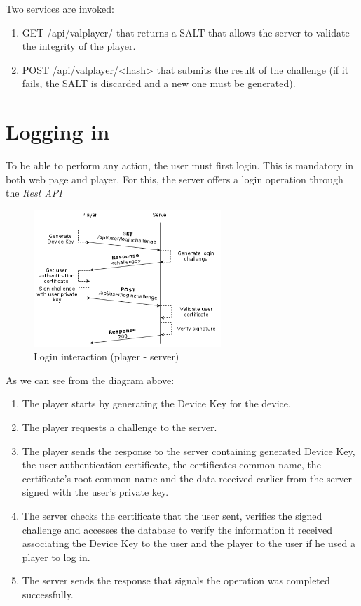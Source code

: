 \documentclass[11pt,a4paper]{report}
\begin{document}
Two services are invoked:  
\begin{enumerate}
\item GET   /api/valplayer/ that returns a SALT that allows the server to validate the integrity of the player.
\item POST  /api/valplayer/<hash> that submits the result of the challenge (if it fails, the SALT is discarded and a new one must be generated).
\end{enumerate}

\section{Logging in}
To be able to perform any action, the user must first login. This is mandatory in both web page and player.
\newline For this, the server offers a login operation through the \emph{Rest API}

\begin{figure}[H]
\centerline{\includegraphics[width=200pt]{images/loginDiagram.png}}
\caption{Login interaction (player - server)}
\label{player}
\end{figure}

As we can see from the diagram above:
\begin{enumerate}
  \item The player starts by generating the Device Key for the device. \label{sec:diagfile}
  \item The player requests a challenge to the server.
  \item The player sends the response to the server containing generated Device Key, the user authentication certificate, the certificates common name, the certificate's root common name and the data received earlier from the server signed with the user's private key. 
  \item The server checks the certificate that the user sent, verifies the signed challenge and accesses the database to verify the information it received associating the Device Key to the user and the player to the user if he used a player to log in.
  \item The server sends the response that signals the operation was completed successfully.
\end{enumerate}
\end{document}
